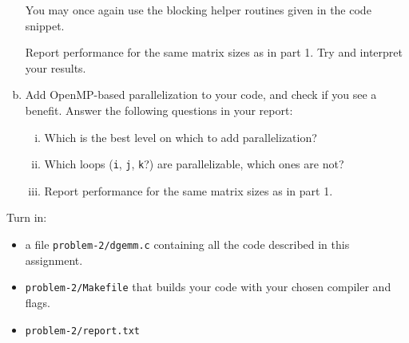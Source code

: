 \documentclass[11pt]{article}
\begin{document}
\begin{enumerate}[a)]
    You may once again use the blocking helper routines given
    in the code snippet.

    Report performance for the same matrix sizes as in part 1.
    Try and interpret your results.

  \item Add OpenMP-based parallelization to your code, and check if
    you see a benefit. Answer the following questions in your report:
    \begin{enumerate}[i.]
      \item Which is the best level on which to add parallelization?
      \item Which loops (\texttt{i}, \texttt{j}, \texttt{k}?) are
        parallelizable, which ones are not?
      \item Report performance for the same matrix sizes as in part 1.
    \end{enumerate}
\end{enumerate}

Turn in:
\begin{itemize}
  \item a file \texttt{problem-2/dgemm.c} containing all the code
    described in this assignment.
  \item \texttt{problem-2/Makefile} that builds your code with your
    chosen compiler and flags.
  \item \texttt{problem-2/report.txt}
\end{itemize}
\end{document}

